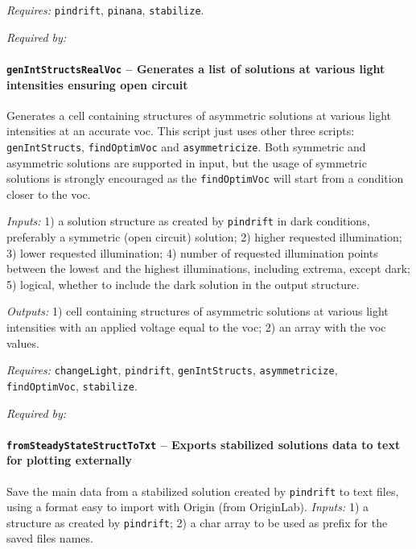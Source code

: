 \textit{Requires:} \texttt{pindrift}, \texttt{pinana}, \texttt{stabilize}.

\textit{Required by:} 

		\paragraph{\texttt{gen\-Int\-Structs\-Real\-Voc} -- Generates a list of solutions at various light intensities ensuring open circuit}
		Generates a cell containing structures of asymmetric solutions at various light intensities at an accurate \gls{voc}.
		This script just uses other three scripts: \texttt{gen\-Int\-Structs}, \texttt{find\-Optim\-Voc}
		 and \texttt{asymmetricize}. Both symmetric and asymmetric solutions are supported in input, but the usage of symmetric solutions is strongly encouraged as the \texttt{find\-Optim\-Voc} will start from a condition closer to the \gls{voc}.
		
				\textit{Inputs:} 1) a solution structure as created by \texttt{pindrift} in dark
				     conditions, preferably a symmetric (open circuit) solution;
				2) higher requested illumination;
				3) lower requested illumination;
				4) number of requested illumination points between the lowest and the highest illuminations, including extrema, except dark;
				5) logical, whether to include the dark solution in the output
				     structure.
				
		\textit{Outputs:} 1) cell containing structures of asymmetric solutions at various light
		     intensities with an applied voltage equal to the \gls{voc};
		2) an array with the \gls{voc} values.
		
		\textit{Requires:} \texttt{change\-Light}, \texttt{pindrift}, \texttt{gen\-Int\-Structs},
		   \texttt{asymmetricize}, \texttt{find\-Optim\-Voc}, \texttt{stabilize}.
		   
		\textit{Required by:} 
		
		\paragraph{\texttt{fromSteadyStateStructToTxt} -- Exports stabilized solutions data to text for plotting externally}
		Save the main data from a stabilized solution created by \texttt{pindrift} to text files, using a format easy to import with Origin (from OriginLab).
				\textit{Inputs:} 1) a structure as created by \texttt{pindrift};
				2) a char array to be used as prefix for the saved files names.

